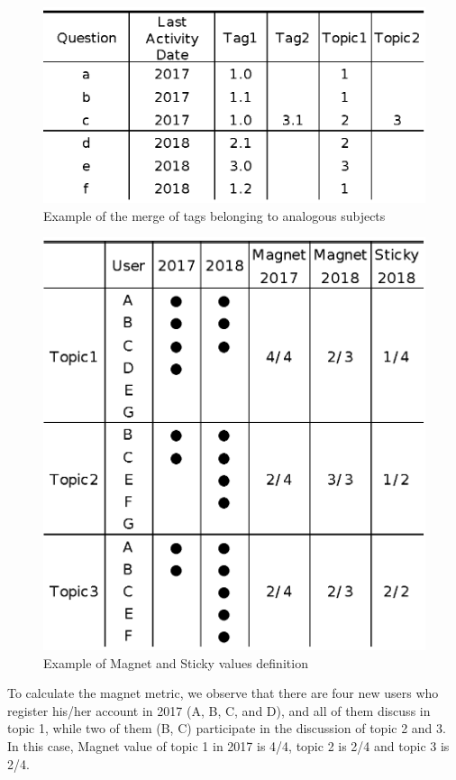 \documentclass[english,preprint,JIP]{ipsj}
\begin{document}
\begin{figure}[t]
 \centering
 \includegraphics[width=1.0\hsize]{img/example001.eps}  
 \caption{Example of the merge of tags belonging to analogous subjects} 
 \label{fig:example1} 
\end{figure}
\smallskip

\begin{figure}[t]
 \centering
 \includegraphics[width=.9\hsize]{img/explainofMS.eps}  
 \caption{Example of Magnet and Sticky values definition} 
 \label{fig:example2} 
\end{figure}
\smallskip

To calculate the magnet metric, we observe that there are four new users who register his/her account in 2017 (A, B, C, and D), and all of them discuss in topic 1, while two of them (B, C) participate in the discussion of topic 2 and 3. In this case, Magnet value of topic 1 in 2017 is 4/4, topic 2 is 2/4 and topic 3 is 2/4.
\end{document}
